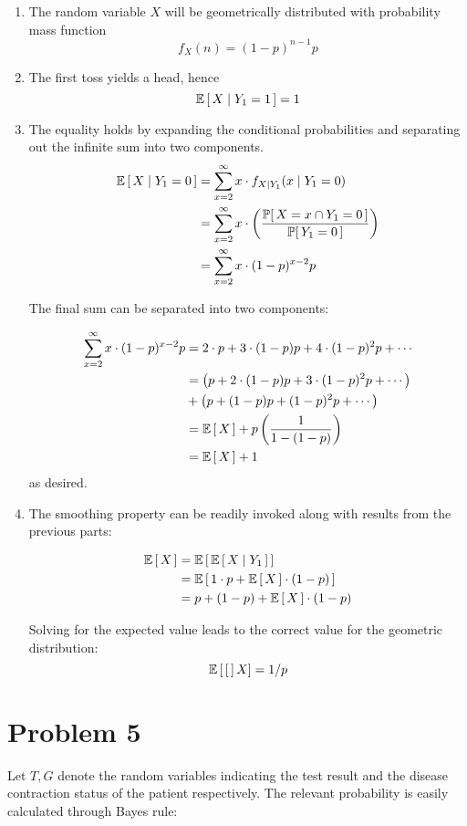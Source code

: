 \documentclass[12pt]{article}%
\begin{document}
\begin{enumerate}
  \item The random variable $X$ will be geometrically distributed with probability mass function \[ f_X(n) = (1-p)^{n-1}p \]

  \item The first toss yields a head, hence
  \[ \mathbb{E}\left[\,X \mid Y_1 = 1\,\right] = 1 \]

  \item The equality holds by expanding the conditional probabilities and separating out the infinite sum into two components.
  \begin{align*}
    \mathbb{E}\left[\,X \mid Y_1 = 0\,\right] & = \sum_{x = 2}^\infty x \cdot f_{X \mid Y_1}(x  \mid Y_1 = 0) \\
    & = \sum_{x = 2}^\infty x \cdot \left( \frac{\mathbb{P}[\,X = x \cap Y_1 = 0\,]}{\mathbb{P}[\,Y_1 = 0\,]}\right) \\
    & = \sum_{x = 2}^\infty x \cdot (1-p)^{x-2}p
  \end{align*}

  The final sum can be separated into two components:

  \begin{align*}
    \sum_{x = 2}^\infty x \cdot (1-p)^{x-2}p & = 2\cdot p + 3\cdot (1-p)p + 4\cdot(1-p)^2p + \cdots \\
    & = \left(p + 2\cdot (1-p)p + 3\cdot(1-p)^2p + \cdots \right) \\
     &  + \left(p + (1-p)p + (1-p)^2 p + \cdots \right) \\
     & = \mathbb{E}\left[\,X\,\right] + p\left(\frac{1}{1 - (1-p)}\right) \\
     & = \mathbb{E}\left[\,X\,\right] + 1
  \end{align*}
  as desired.

  \item
  The smoothing property can be readily invoked along with results from the previous parts:

 \begin{align*}
   \mathbb{E}\left[\,X\,\right] & = \mathbb{E}\left[\,\mathbb{E}\left[\,X \mid Y_1\,\right]\,\right] \\
   & = \mathbb{E}\left[\, 1\cdot p  + \mathbb{E}\left[\,X\,\right]\cdot (1-p)\,\right] \\
   & = p + (1-p) + \mathbb{E}\left[\,X\,\right]\cdot(1-p) \\
 \end{align*}

  Solving for the expected value leads to the correct value for the geometric distribution:
  \[\mathbb{E}\left[\,[\,\right]X] = 1/p \]
\end{enumerate}

\section{Problem 5}
Let $T,G$ denote the random variables indicating the test result and the disease contraction status of the patient respectively. The relevant probability is easily calculated through Bayes rule:
\end{document}
